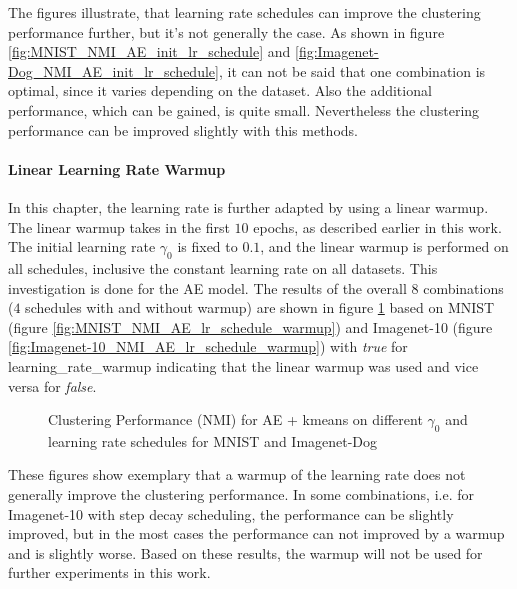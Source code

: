 \documentclass[12pt,DIV14,BCOR12mm,a4paper,footexclude,headinclude,halfparskip-,twoside,openright,cleardoubleempty,idxtotoc,bibtotoc,listtotoc]{scrreprt} %
\numberwithin{equation}{chapter}
\begin{document}
The figures illustrate, that learning rate schedules can improve the clustering performance further, but it's not generally the case. As shown in figure \ref{fig:MNIST_NMI_AE_init_lr_schedule} and \ref{fig:Imagenet-Dog_NMI_AE_init_lr_schedule}, it can not be said that one combination is optimal, since it varies depending on the dataset. Also the additional performance, which can be gained, is quite small. Nevertheless the clustering performance can be improved slightly with this methods.
\paragraph{Linear Learning Rate Warmup}
In this chapter, the learning rate is further adapted by using a linear warmup. The linear warmup takes in the first $10$ epochs, as described earlier in this work. The initial learning rate $\gamma_0$ is fixed to $0.1$, and the linear warmup is performed on all schedules, inclusive the constant learning rate on all datasets. This investigation is done for the AE model. The results of the overall $8$ combinations ($4$ schedules with and without warmup) are shown in figure \ref{fig:ClusterPerformance_AE_lr_schedule_warmup} based on MNIST (figure \ref{fig:MNIST_NMI_AE_lr_schedule_warmup}) and Imagenet-10 (figure \ref{fig:Imagenet-10_NMI_AE_lr_schedule_warmup}) with \textit{true} for learning\_rate\_warmup indicating that the linear warmup was used and vice versa for \textit{false}.
	 \begin{figure}[htb!]
		\centering
		\qquad
		\caption{Clustering Performance (NMI) for AE + kmeans on different $\gamma_0$ and learning rate schedules for MNIST and Imagenet-Dog}
		\label{fig:ClusterPerformance_AE_lr_schedule_warmup}
	\end{figure}
These figures show exemplary that a warmup of the learning rate does not generally improve the clustering performance. In some combinations, i.e. for Imagenet-10 with step decay scheduling, the performance can be slightly improved, but in the most cases the performance can not improved by a warmup and is slightly worse. Based on these results, the warmup will not be used for further experiments in this work. 
\end{document}

